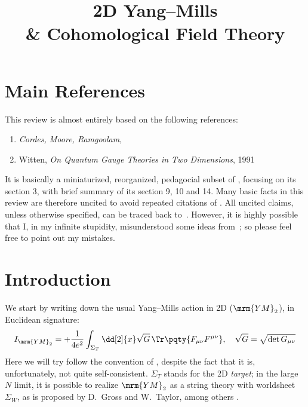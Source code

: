 \documentclass[a4paper
	,10pt
]{article}
\title{2D Yang--Mills \\ \& Cohomological Field Theory}
\newcommand{\YM}{{\ensuremath{\mrm{YM}_2}}\xspace}
\begin{document}
\maketitle
{}
\thispagestyle{empty}


\setlength{\parskip}{.1\baselineskip}
\tableofcontents
\setlength{\parskip}{\parskipnorm}

\section*{Main References}
	This review is almost entirely based on the following references:
	\begin{enumerate}[
		noitemsep
		,labelindent=\parindent
		,align=left
		,leftmargin=*
	]
	\item[\cite{Cordes:1994fc}] \textit{Cordes, Moore, Ramgoolam}, 
	\item[\cite{Witten:1991we}] Witten, \textit{On Quantum Gauge Theories in Two Dimensions}, 1991
	\end{enumerate}
	It is basically a miniaturized, reorganized, pedagocial subset of \cite{Cordes:1994fc}, focusing on its section 3, with brief summary of its section 9, 10 and 14. Many basic facts in this review are therefore uncited to avoid repeated citations of \cite{Cordes:1994fc}. All uncited claims, unless otherwise specified, can be traced back to~\cite{Cordes:1994fc}. However, it is highly possible that I, in my infinite stupidity, misunderstood some ideas from~\cite{Cordes:1994fc}; so please feel free to point out my mistakes.
\section{Introduction}
	We start by writing down the usual Yang--Mills action in 2D (\YM), in Euclidean signature:
	\begin{equation}
		I_{\YM}
		= +\frac{1}{4e^2}
			\int_{\Sigma_T} \dd[2]{x}
			\sqrt{G}
			\,\Tr \pqty{F_{\mu\nu} F^{\mu\nu}},
	\quad
		\sqrt{G} = \sqrt{\det G_{\mu\nu}}
	\end{equation}
	Here we will try follow the convention of \cite{Cordes:1994fc}, despite the fact that it is, unfortunately, not quite self-consistent. $\Sigma_T$ stands for the 2D \textit{target}; in the large $N$ limit, it is possible to realize \YM as a string theory with worldsheet $\Sigma_W$, as is proposed by D.~Gross and W.~Taylor, among others \cite{Gross:1992tu,Gross:1993hu,Gross:1993yt}. 
	
\end{document}
